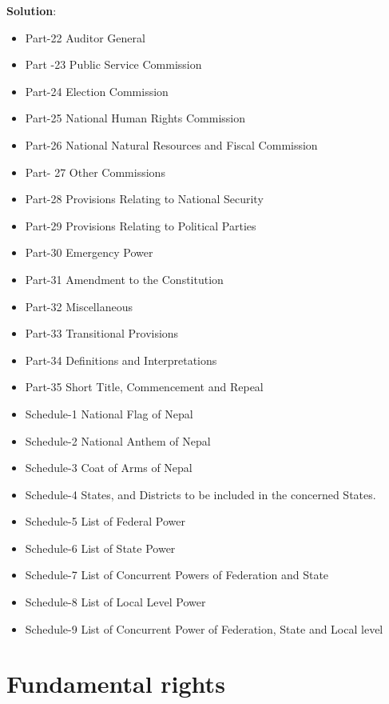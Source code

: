 \documentclass[
  openany]{book}
\newenvironment{solution}{ {\bfseries Solution}:}{}
\begin{document}
\begin{questions}
\begin{solution}
\begin{itemize}
  \item Part-22 Auditor General
  \item Part -23 Public Service Commission
  \item Part-24 Election Commission
  \item Part-25 National Human Rights Commission
  \item Part-26 National Natural Resources and Fiscal Commission
  \item Part- 27 Other Commissions
  \item Part-28 Provisions Relating to National Security
  \item Part-29 Provisions Relating to Political Parties
  \item Part-30 Emergency Power
  \item Part-31 Amendment to the Constitution
  \item Part-32 Miscellaneous
  \item Part-33 Transitional Provisions
  \item Part-34 Definitions and Interpretations
  \item Part-35 Short Title, Commencement and Repeal
  \item Schedule-1 National Flag of Nepal
  \item Schedule-2 National Anthem of Nepal
  \item Schedule-3 Coat of Arms of Nepal
  \item Schedule-4 States, and Districts to be included in the concerned States.
  \item Schedule-5 List of Federal Power
  \item Schedule-6 List of State Power
  \item Schedule-7 List of Concurrent Powers of Federation and State
  \item Schedule-8 List of Local Level Power
  \item Schedule-9 List of Concurrent Power of Federation, State and Local level
  \end{itemize}
  \end{solution}
\end{questions}

\hypertarget{fundamental-rights}{%
\section{Fundamental rights}\label{fundamental-rights}}
\end{document}
